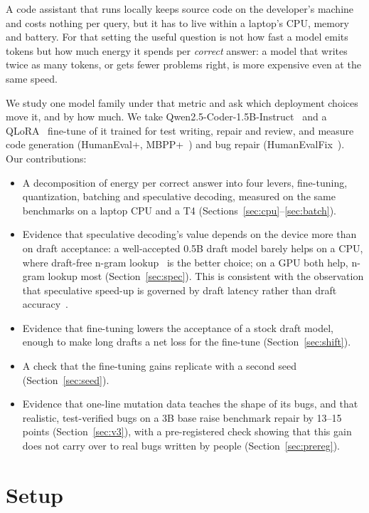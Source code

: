 \documentclass[11pt]{article}
\begin{document}
A code assistant that runs locally keeps source code on the developer's machine and costs
nothing per query, but it has to live within a laptop's CPU, memory and battery. For that setting
the useful question is not how fast a model emits tokens but how much energy it spends per
\emph{correct} answer: a model that writes twice as many tokens, or gets fewer problems right,
is more expensive even at the same speed.

We study one model family under that metric and ask which deployment choices move it, and by how
much. We take Qwen2.5-Coder-1.5B-Instruct~\citep{hui2024qwen25coder} and a QLoRA~\citep{dettmers2023qlora}
fine-tune of it trained for test writing, repair and review, and measure code generation
(HumanEval+, MBPP+~\citep{liu2023evalplus}) and bug repair (HumanEvalFix~\citep{muennighoff2023octopack}).
Our contributions:

\begin{itemize}
\item A decomposition of energy per correct answer into four levers, fine-tuning, quantization,
  batching and speculative decoding, measured on the same benchmarks on a laptop CPU and a T4
  (Sections~\ref{sec:cpu}--\ref{sec:batch}).
\item Evidence that speculative decoding's value depends on the device more than on draft
  acceptance: a well-accepted 0.5B draft model barely helps on a CPU, where draft-free n-gram
  lookup~\citep{saxena2023pld} is the better choice; on a GPU both help, n-gram lookup most
  (Section~\ref{sec:spec}). This is consistent with the observation that speculative speed-up
  is governed by draft latency rather than draft accuracy~\citep{yan2025decoding}.
\item Evidence that fine-tuning lowers the acceptance of a stock draft model, enough to make long
  drafts a net loss for the fine-tune (Section~\ref{sec:shift}).
\item A check that the fine-tuning gains replicate with a second seed (Section~\ref{sec:seed}).
\item Evidence that one-line mutation data teaches the shape of its bugs, and that realistic,
  test-verified bugs on a 3B base raise benchmark repair by 13--15 points (Section~\ref{sec:v3}),
  with a pre-registered check showing that this gain does not carry over to real bugs written by
  people (Section~\ref{sec:prereg}).
\end{itemize}

\section{Setup}
\end{document}
